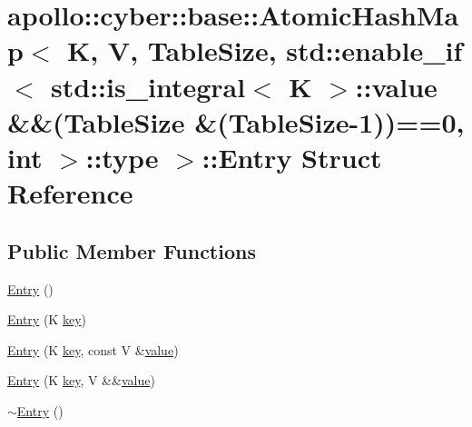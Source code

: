 \hypertarget{structapollo_1_1cyber_1_1base_1_1AtomicHashMap_1_1Entry}{\section{apollo\-:\-:cyber\-:\-:base\-:\-:Atomic\-Hash\-Map$<$ K, V, Table\-Size, std\-:\-:enable\-\_\-if$<$ std\-:\-:is\-\_\-integral$<$ K $>$\-:\-:value \&\&(Table\-Size \&(Table\-Size-\/1))==0, int $>$\-:\-:type $>$\-:\-:Entry Struct Reference}
\label{structapollo_1_1cyber_1_1base_1_1AtomicHashMap_1_1Entry}
}
\subsection*{Public Member Functions}
\begin{DoxyCompactItemize}
\item 
\hyperlink{structapollo_1_1cyber_1_1base_1_1AtomicHashMap_1_1Entry_ae852819828fc6a7b68db072dea8640b9}{Entry} ()
\item 
\hyperlink{structapollo_1_1cyber_1_1base_1_1AtomicHashMap_1_1Entry_a325c68fbf78f04f185fdf7b69f893917}{Entry} (K \hyperlink{structapollo_1_1cyber_1_1base_1_1AtomicHashMap_1_1Entry_a92d89dfd94973438aa8db43a8bbebee6}{key})
\item 
\hyperlink{structapollo_1_1cyber_1_1base_1_1AtomicHashMap_1_1Entry_aa9d4d2fcabc83b9969e2d56336afcf52}{Entry} (K \hyperlink{structapollo_1_1cyber_1_1base_1_1AtomicHashMap_1_1Entry_a92d89dfd94973438aa8db43a8bbebee6}{key}, const V \&\hyperlink{namespaceapollo_1_1cyber_1_1base_aa3e2fff9b18a1214af4a70546fb7120f}{value})
\item 
\hyperlink{structapollo_1_1cyber_1_1base_1_1AtomicHashMap_1_1Entry_af5776001b463532d197e002e411ed8f1}{Entry} (K \hyperlink{structapollo_1_1cyber_1_1base_1_1AtomicHashMap_1_1Entry_a92d89dfd94973438aa8db43a8bbebee6}{key}, V \&\&\hyperlink{namespaceapollo_1_1cyber_1_1base_aa3e2fff9b18a1214af4a70546fb7120f}{value})
\item 
\hyperlink{structapollo_1_1cyber_1_1base_1_1AtomicHashMap_1_1Entry_a70be561c45093c3010e8d08a12aaafa8}{$\sim$\-Entry} ()
\end{DoxyCompactItemize}
